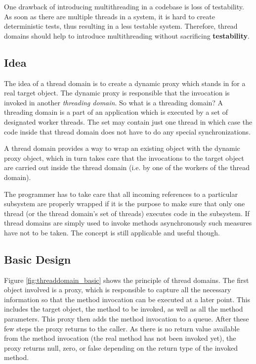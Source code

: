 One drawback of introducing multithreading in a codebase is loss of
testability. As soon as there are multiple threads in a system, it is
hard to create deterministic tests, thus resulting in a less testable
system. Therefore, thread domains should help to introduce multithreading
without sacrificing \textbf{testability}.


\subsection{Idea}
The idea of a thread domain is to create a dynamic proxy which stands
in for a real target object. The dynamic proxy is responsible that the
invocation is invoked in another \emph{threading domain}. So what is
a threading domain? A threading domain is a part of an application
which is executed by a set of designated worker threads. The set may
contain just one thread in which case the code inside that thread domain
does not have to do any special synchronizations.

A thread domain provides a way to wrap an existing object with the dynamic
proxy object, which in turn takes care that the invocations to the
target object are carried out inside the thread domain (i.e. by one of
the workers of the thread domain).

The programmer has to take care that all incoming references
to a particular subsystem are properly wrapped if it is the purpose to
make sure that only one thread (or the thread domain's set of threads)
executes code in the subsystem. If thread domains are simply used to
invoke methods asynchronously such measures have not to be taken. The
concept is still applicable and useful though.


\subsection{Basic Design}
\label{sect:threaddomain.introduction.principle}
Figure \ref{fig:threaddomain_basic} shows the principle of thread domains.
The first object involved is a proxy, which is responsible to
capture all the necessary information so that the method invocation can
be executed at a later point. This includes the target object, the method
to be invoked, as well as all the method parameters. This proxy then adds
the method invocation to a queue. After these few steps the proxy returns
to the caller. As there is no return value available from the method 
invocation (the real method has not been invoked yet), the proxy returns
null, zero, or false depending on the return type of the
invoked method.

